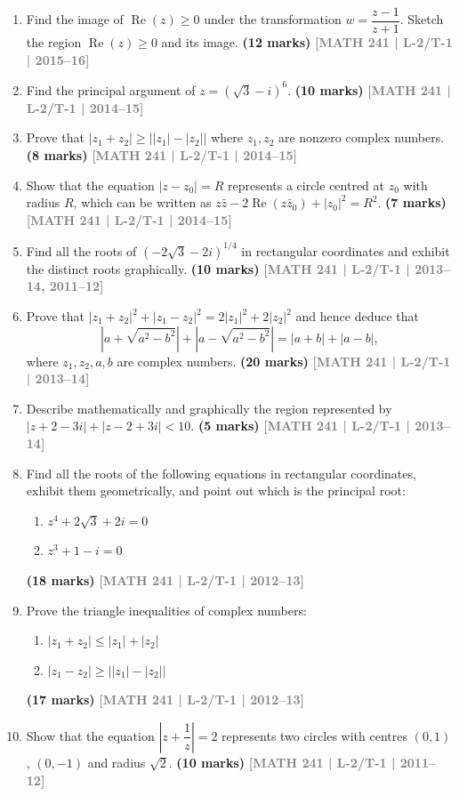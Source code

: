 \documentclass[12pt]{article}
\newcommand{\yr}[1]{\hfill\textcolor{gray}{\small\textbf{[#1]}}}
\newcommand{\mk}[1]{\textcolor{orange!70!black}{\small\textbf{(#1 marks)}}}
\begin{document}
\begin{enumerate}
\item Find the image of $\operatorname{Re}(z)\ge 0$ under the transformation $w=\dfrac{z-1}{z+1}$. Sketch the region $\operatorname{Re}(z)\ge 0$ and its image.
\mk{12} \yr{MATH 241 | L-2/T-1 | 2015--16}

\item Find the principal argument of $z=(\sqrt{3}-i)^{6}$.
\mk{10} \yr{MATH 241 | L-2/T-1 | 2014--15}

\item Prove that $|z_{1}+z_{2}| \ge \bigl||z_{1}|-|z_{2}|\bigr|$ where $z_{1},z_{2}$ are nonzero complex numbers.
\mk{8} \yr{MATH 241 | L-2/T-1 | 2014--15}

\item Show that the equation $|z-z_{0}|=R$ represents a circle centred at $z_{0}$ with radius $R$, which can be written as $z\bar{z}-2\operatorname{Re}(z\bar{z}_{0})+|z_{0}|^{2}=R^{2}$.
\mk{7} \yr{MATH 241 | L-2/T-1 | 2014--15}

\item Find all the roots of $(-2\sqrt{3}-2i)^{1/4}$ in rectangular coordinates and exhibit the distinct roots graphically.
\mk{10} \yr{MATH 241 | L-2/T-1 | 2013--14, 2011--12}

\item Prove that $|z_{1}+z_{2}|^{2}+|z_{1}-z_{2}|^{2}=2|z_{1}|^{2}+2|z_{2}|^{2}$ and hence deduce that
\[
\left|a+\sqrt{a^{2}-b^{2}}\right|+\left|a-\sqrt{a^{2}-b^{2}}\right|=|a+b|+|a-b|,
\]
where $z_{1},z_{2},a,b$ are complex numbers.
\mk{20} \yr{MATH 241 | L-2/T-1 | 2013--14}

\item Describe mathematically and graphically the region represented by $|z+2-3i|+|z-2+3i|<10$.
\mk{5} \yr{MATH 241 | L-2/T-1 | 2013--14}

\item Find all the roots of the following equations in rectangular coordinates, exhibit them geometrically, and point out which is the principal root:
\begin{enumerate}
  \item $z^{4}+2\sqrt{3}+2i=0$
  \item $z^{3}+1-i=0$
\end{enumerate}
\mk{18} \yr{MATH 241 | L-2/T-1 | 2012--13}

\item Prove the triangle inequalities of complex numbers:
\begin{enumerate}
  \item $|z_{1}+z_{2}| \le |z_{1}|+|z_{2}|$
  \item $|z_{1}-z_{2}| \ge \bigl||z_{1}|-|z_{2}|\bigr|$
\end{enumerate}
\mk{17} \yr{MATH 241 | L-2/T-1 | 2012--13}

\item Show that the equation $\left|z+\dfrac{1}{z}\right|=2$ represents two circles with centres $(0,1)$, $(0,-1)$ and radius $\sqrt{2}$.
\mk{10} \yr{MATH 241 | L-2/T-1 | 2011--12}

\end{enumerate}
\end{document}
